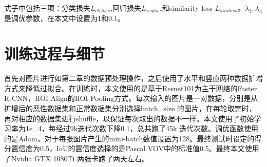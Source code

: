 式子中包括三项：分类损失$L_{clsloss}$,回归损失$L_{regloss}$和similarity loss $L_{simloss}$。$\lambda_3,\lambda_4$ 是调优参数，在本文中设置为1和0.1。


\section{训练过程与细节}
首先对图片进行如第二章的数据预处理操作，之后使用了水平和竖直两种数据扩增方式来降低过拟合。在训练时，本文使用的是基于Resnet101为主干网络的Faster R-CNN，ROI Align的ROI Pooling方式。每次输入的图片是一对数据，分别是从扩增后的恶性数据集和正常数据集分别选择batch\_size 的图片，在每轮取完时，再对相应的数据集进行shuffle，以保证每次取出的数据不一样。本文使用了初始学习率为1e\_4，每经过9k迭代次数下降0.1，总共跑了45k 迭代次数。调优函数使用的是Adam，对于每张图片产生的mini-batch数值设置为128。最终测试时设定的得分置信度为0.5，IoU的置信度选择的是Pascal VOV中的标准值0.5。最终本文使用了Nvidia GTX 1080Ti 两张卡跑了两天左右。

\begin{comment}
其中对于本文数据跑的几个结果的损失下降曲线如下\ref{fig:1_stage_loss}。

\begin{figure}[!htbp]
    \centering
    \begin{subfigure}[a]{1.0\textwidth}
      \texttt{[image: stage1\_fa]}
      \caption{}
      \label{fig:stage1_fa}
    \end{subfigure}%
    
    ~%
    \begin{subfigure}[b]{1.0\textwidth}
      \texttt{[image: stage1\_fa\_tl]}
      \caption{}
      \label{fig:stage1_fa_tl}
    \end{subfigure}
    
    \begin{subfigure}[c]{1.0\textwidth}
      \texttt{[image: stage1\_fa\_tl\_sim]}
      \caption{}
      \label{fig:stage1_fa_tl_sim}
    \end{subfigure}

    \bicaption{一阶段不同模型的损失下降曲线图(a) Faster R-CNN 模型loss下降图(b) Faster R-CNN + tlloss模型loss下降图 (c)simFaster R-CNN模型loss下降图}
    {The loss curve for different models for 1-stage model (a) loss curve for Faster R-CNN (b) loss curve for Faster R-CNN + tlloss (c)loss curve for Faster R-CNN + tlloss + simloss}
    \label{fig:1_stage_loss}
\end{figure}
\end{comment}

